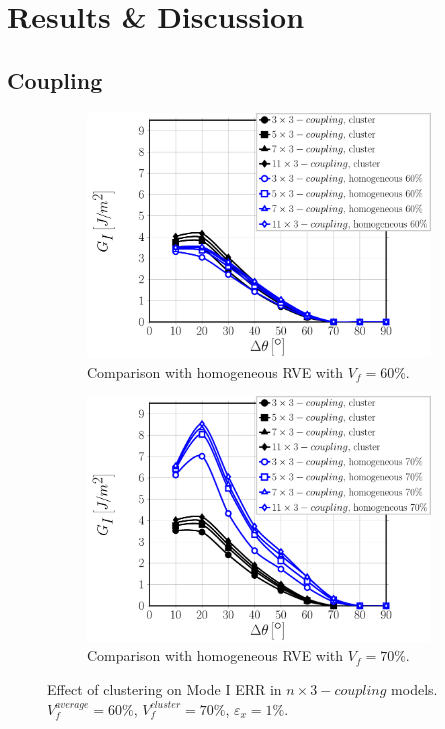 \documentclass[review]{elsarticle}
\begin{document}
\section{Results \& Discussion}

\subsection{Coupling}\label{subsec:coupling}

\begin{figure}[!h]
\centering
    \begin{subfigure}[b]{0.475\textwidth}
        \includegraphics[width=\textwidth]{nx1-coupling-vf60-GI.pdf}
        \caption{Comparison with homogeneous RVE with $V_{f}=60\%$.}\label{subfig:clusterCouplingnx3ModeI60}
    \end{subfigure}\quad
    \begin{subfigure}[b]{0.475\textwidth}
        \includegraphics[width=\textwidth]{nx1-coupling-vf70-GI.pdf}
        \caption{Comparison with homogeneous RVE with $V_{f}=70\%$.}\label{subfig:clusterCouplingnx3ModeI70}
    \end{subfigure}

\caption{Effect of clustering on Mode I ERR in $n\times 3-coupling$ models. $V^{average}_{f}=60\%$, $V^{cluster}_{f}=70\%$, $\varepsilon_{x}=1\%$.}\label{fig:clusterCouplingnx3ModeI}
\end{figure}
\end{document}
